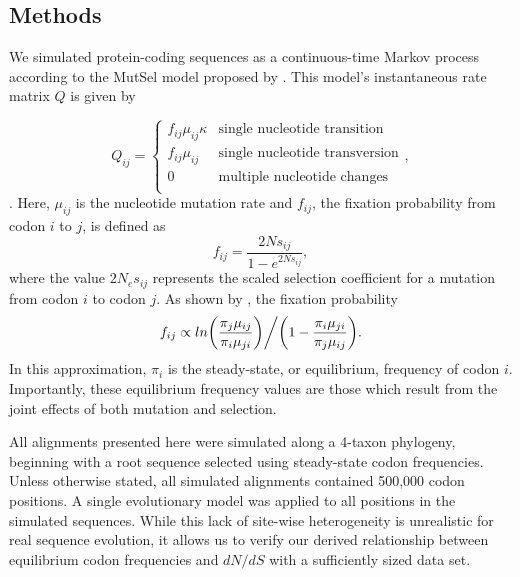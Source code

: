 \documentclass{pnastwo}
\begin{document}
\begin{article}
\section*{Methods}

We simulated protein-coding sequences as a continuous-time Markov process \cite{Yang2006} according to the MutSel model proposed by \cite{HalpernBruno1998}. This model's instantaneous rate matrix $Q$ is given by 

\begin{equation}\label{eq:HBmatrix}
	Q_{ij} = \left\{ \begin{array}{rl}
		f_{ij}\mu_{ij}\kappa               &\mbox{single nucleotide transition} \\
		f_{ij}\mu_{ij}                          &\mbox{single nucleotide transversion} \\
		0                                           &\mbox{multiple nucleotide changes} \\             
	\end{array} \right.,
\end{equation}. Here, $\mu_{ij}$ is the nucleotide mutation rate and $f_{ij}$, the fixation probability from codon $i$ to $j$, is defined as 
\begin{equation} f_{ij}  = \frac{2Ns_{ij}}{1 - e^{2Ns_{ij}}}, \end{equation} where the value $2N_es_{ij}$ represents the scaled selection coefficient for a mutation from codon $i$ to codon $j$\cite{HalpernBruno1998, YangNielsen2008}. As shown by \cite{HalpernBruno1998}, the fixation probability \begin{equation}f_{ij} \propto ln\bigg{(}\frac{\pi_j\mu_{ij}}{\pi_i\mu_{ji}}\bigg{)}\bigg{/}\bigg{(}1 - \frac{\pi_i\mu_{ji}}{\pi_j\mu_{ij}}\bigg{)}.\end{equation} In this approximation, $\pi_i$ is the steady-state, or equilibrium, frequency of codon $i$. Importantly, these equilibrium frequency values are those which result from the joint effects of both mutation and selection. 


All alignments presented here were simulated along a 4-taxon phylogeny, beginning with a root sequence selected using steady-state codon frequencies. Unless otherwise stated, all simulated alignments contained 500,000 codon positions. A single evolutionary model was applied to all positions in the simulated sequences. While this lack of site-wise heterogeneity is unrealistic for real sequence evolution, it allows us to verify our derived relationship between equilibrium codon frequencies and $dN/dS$ with a sufficiently sized data set.



\end{article}
\end{document}
